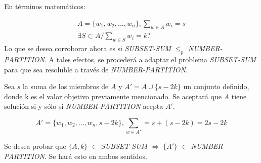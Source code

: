 En términos matemáticos:

\begin{gather*}
    A = \{w_{1}, w_{2}, ..., w_{n}\}, \sum_{w \in A} w_{i} = s \\
    \exists S \subset A  / \sum_{w \in S} w_{i} = k ?
\end{gather*}
Lo que se desea corroborar ahora es si \textit{SUBSET-SUM} $ \leq_{p} $ \textit{NUMBER-PARTITION}.
A tales efectos, se procederá a adaptar el problema \textit{SUBSET-SUM} para que sea resoluble a través de \textit{NUMBER-PARTITION}. 

Sea $s$ la suma de los miembros de $A$ y $A' = A \cup \{s-2k\}$ un conjunto definido, donde k es el valor objetivo previamente mencionado. Se aceptará que $A$ tiene solución si y sólo si \textit{NUMBER-PARTITION} acepta $A'$.

\begin{equation}
    A' = \{w_{1}, w_{2}, ..., w_{n}, s-2k\}, \sum_{w \in A'} = s + (s-2k) = 2s-2k
\end{equation}

Se desea probar que
$\{A,k\}$ $\in $ \textit{SUBSET-SUM} $\Leftrightarrow$ $\{A'\}$ $\in$ \textit{NUMBER-PARTITION}. Se hará esto en ambos sentidos.

